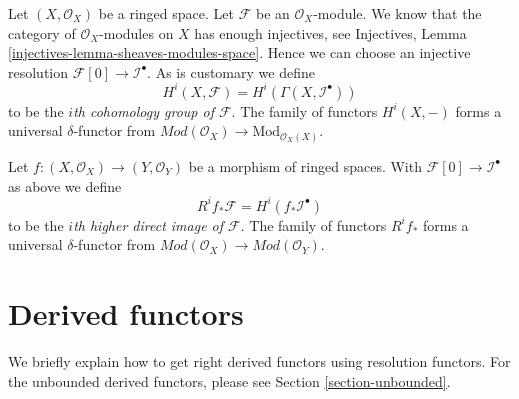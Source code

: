 \medskip\noindent
Let $(X, \mathcal{O}_X)$ be a ringed space. Let $\mathcal{F}$ be an
$\mathcal{O}_X$-module. We know that the category of $\mathcal{O}_X$-modules
on $X$ has enough injectives, see
Injectives, Lemma \ref{injectives-lemma-sheaves-modules-space}.
Hence we can choose an injective resolution
$\mathcal{F}[0] \to \mathcal{I}^\bullet$. As is customary we define
\begin{equation}
\label{equation-cohomology-modules}
H^i(X, \mathcal{F}) = H^i(\Gamma(X, \mathcal{I}^\bullet))
\end{equation}
to be the {\it $i$th cohomology group of $\mathcal{F}$}.
The family of functors $H^i(X, -)$ forms a universal $\delta$-functor
from $\textit{Mod}(\mathcal{O}_X) \to \text{Mod}_{\mathcal{O}_X(X)}$.

\medskip\noindent
Let $f : (X, \mathcal{O}_X) \to (Y, \mathcal{O}_Y)$ be a morphism of ringed
spaces. With $\mathcal{F}[0] \to \mathcal{I}^\bullet$ as above
we define
\begin{equation}
\label{equation-higher-direct-image-modules}
R^if_*\mathcal{F} = H^i(f_*\mathcal{I}^\bullet)
\end{equation}
to be the {\it $i$th higher direct image of $\mathcal{F}$}.
The family of functors $R^if_*$ forms a universal $\delta$-functor
from $\textit{Mod}(\mathcal{O}_X) \to \textit{Mod}(\mathcal{O}_Y)$.





\section{Derived functors}
\label{section-derived-functors}

\noindent
We briefly explain how to get right derived functors using resolution
functors. For the unbounded derived functors, please see
Section \ref{section-unbounded}.

